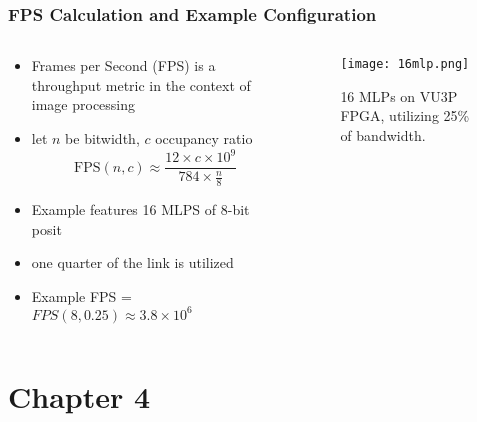 \begin{frame}
    \frametitle{FPS Calculation and Example Configuration}

    \begin{columns}
        \begin{column}{0.6\textwidth}
            \begin{itemize}
		\item<1-> Frames per Second (FPS) is a throughput metric in the context of image processing
                \item<2-> let $n$ be bitwidth, $c$ occupancy ratio
                \begin{equation}
                    \text{FPS}(n, c) \approx \frac{12 \times c \times 10^9}{784 \times \frac{n}{8}}\nonumber
                \end{equation}
                \item<3-> Example features 16 MLPS of 8-bit posit
                \item<3-> one quarter of the link is utilized
		\item<3-> Example FPS = $FPS(8,0.25)\approx3.8\times10^{6}$
            \end{itemize}
        \end{column}

        \begin{column}{0.4\textwidth}
	    \begin{figure}[H]
            \centering
            \texttt{[image: 16mlp.png]}
            \caption{16 MLPs on VU3P FPGA, utilizing 25\% of bandwidth.}
            \label{fig:16mlp}
	    \end{figure}
        \end{column}
    \end{columns}

\end{frame}

\section{Chapter 4}



